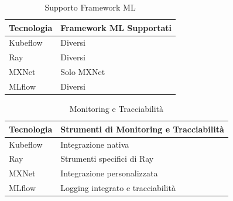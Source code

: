    \begin{table}[h]
    \centering
    \caption*{Supporto Framework ML}
    \begin{tabular}{|l|l|}
    \hline
    \textbf{Tecnologia} & \textbf{Framework ML Supportati} \\ \hline
    Kubeflow & Diversi \\ \hline
    Ray & Diversi \\ \hline
    MXNet & Solo MXNet \\ \hline
    MLflow & Diversi \\ \hline
    \end{tabular}
    \end{table}
    
    \begin{table}[h]
    \centering
    \caption*{Monitoring e Tracciabilità}
    \begin{tabular}{|l|l|}
    \hline
    \textbf{Tecnologia} & \textbf{Strumenti di Monitoring e Tracciabilità} \\ \hline
    Kubeflow & Integrazione nativa \\ \hline
    Ray & Strumenti specifici di Ray \\ \hline
    MXNet & Integrazione personalizzata \\ \hline
    MLflow & Logging integrato e tracciabilità \\ \hline
    \end{tabular}
    \end{table}

\clearpage